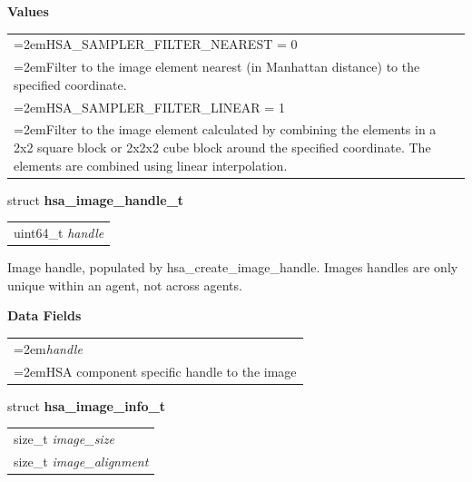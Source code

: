 \documentclass{book}
\newcommand{\hsaarg}[1]{\textit{#1}}
\newcommand{\hsadef}[2]{\hypertarget{#1}{\textbf{#2}}}
\newcommand{\hsatyp}[2]{\hypertarget{#1}{#2}}
\begin{document}
\begin{appendices}
\noindent\textbf{Values}\\[-5mm]
\begin{longtable}{@{}>{\hangindent=2em}p{\linewidth}}
HSA\_SAMPLER\_FILTER\_NEAREST = 0\\\hspace{2em}Filter to the image element nearest (in Manhattan distance) to the specified coordinate.\\[2mm]
HSA\_SAMPLER\_FILTER\_LINEAR = 1\\\hspace{2em}Filter to the image element calculated by combining the elements in a 2x2 square block or 2x2x2 cube block around the specified coordinate. The elements are combined using linear interpolation.
\end{longtable}

\noindent\begin{tcolorbox}[nobeforeafter,arc=0mm,colframe=white,colback=lightgray,left=0mm]
struct \hsadef{group__API__images_1ga0aeecea8e818df4cec2eccb3a5e85d5f}{hsa\_image\_handle\_t} \\
\begin{tabular}{@{}l}
\hspace{1.7em}uint64\_t \hsaarg{handle}
\end{tabular}

\end{tcolorbox}
Image handle, populated by \hsatyp{group__API__images_1gaebf197189d4748950631148d12be38cb}{hsa\_create\_image\_handle}. Images handles are only unique within an agent, not across agents.

\noindent\textbf{Data Fields}\\[-5mm]
\begin{longtable}{@{}>{\hangindent=2em}p{\textwidth}}
\hsaarg{handle}\\\hspace{2em}HSA component specific handle to the image
\end{longtable}



\noindent\begin{tcolorbox}[nobeforeafter,arc=0mm,colframe=white,colback=lightgray,left=0mm]
struct \hsadef{group__API__images_1ga8b226310d50050b6a9ad73c91ee6eca2}{hsa\_image\_info\_t} \\
\begin{tabular}{@{}l}
\hspace{1.7em}size\_t \hsaarg{image\_size}\\
\hspace{1.7em}size\_t \hsaarg{image\_alignment}
\end{tabular}


\end{tcolorbox}
\end{appendices}
\end{document}
